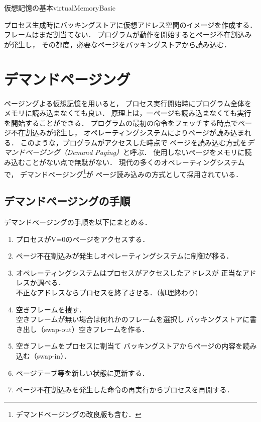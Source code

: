          {仮想記憶の基本}{virtualMemoryBasic}

プロセス生成時にバッキングストアに仮想アドレス空間のイメージを作成する．
フレームはまだ割当てない．
プログラムが動作を開始するとページ不在割込みが発生し，
その都度，必要なページをバッキングストアから読み込む．

\section{デマンドページング}\label{demandPaging}
ページングよる仮想記憶を用いると，
プロセス実行開始時にプログラム全体をメモリに読み込まなくても良い．
原理上は，一ページも読み込まなくても実行を開始することができる．
プログラムの最初の命令をフェッチする時点でページ不在割込みが発生し，
オペレーティングシステムによりページが読み込まれる．
このような，プログラムがアクセスした時点で
ページを読み込む方式を\emph{デマンドページング（Demand Paging）}と呼ぶ．
使用しないページをメモリに読み込むことがない点で無駄がない．
現代の多くのオペレーティングシステムで，
デマンドページング\footnote{デマンドページングの改良版も含む．}が
ページ読み込みの方式として採用されている．

\subsection{デマンドページングの手順}
デマンドページングの手順を以下にまとめる．

\begin{enumerate}
\item プロセスがV=0のページをアクセスする．
\item ページ不在割込みが発生しオペレーティングシステムに制御が移る．
\item オペレーティングシステムはプロセスがアクセスしたアドレスが
  正当なアドレスか調べる．\\
  不正なアドレスならプロセスを終了させる．（処理終わり）
\item 空きフレームを捜す．\\
  空きフレームが無い場合は何れかのフレームを選択し
  バッキングストアに書き出し（swap-out）空きフレームを作る．
\item 空きフレームをプロセスに割当て
  バッキングストアからページの内容を読み込む（swap-in）．
\item ページテーブ等を新しい状態に更新する．
\item ページ不在割込みを発生した命令の再実行からプロセスを再開する．
\end{enumerate}

